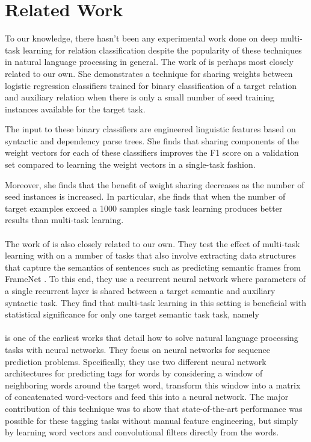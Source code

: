 \section{Related Work}
To our knowledge, there hasn't been any experimental work done on deep multi-task learning for relation classification despite the popularity of these techniques in natural language processing in general. The work of \citet{jiang2009} is perhaps most closely related to our own. She demonstrates a technique for sharing weights between logistic regression classifiers trained for binary classification of a target relation and auxiliary relation when there is only a small number of seed training instances available for the target task. 

The input to these binary classifiers are engineered linguistic features based on syntactic and dependency parse trees. She finds that sharing components of the weight vectors for each of these classifiers improves the F1 score on a validation set compared to learning the weight vectors in a single-task fashion.

Moreover, she finds that the benefit of weight sharing decreases as the number of seed instances is increased. In particular, she finds that when the number of target examples exceed a 1000 samples single task learning produces better results than multi-task learning.
\\\\
The work of \citet{alonso2016} is also closely related to our own. They test the effect of multi-task learning with on a number of tasks that also involve extracting data structures that capture the semantics of sentences such as predicting semantic frames from FrameNet \cite{baker1998}. To this end, they use a recurrent neural network where parameters of a single recurrent layer is shared between a target semantic and auxiliary syntactic task. They find that multi-task learning in this setting is beneficial with statistical significance for only one target semantic task task, namely 
\\\\
\citet{collobert2011} is one of the earliest works that detail how to solve natural language processing tasks with neural networks. They focus on neural networks for sequence prediction problems. Specifically, they use two different neural network architectures for predicting tags for words by considering a window of neighboring words around the target word, transform this window into a matrix of concatenated word-vectors and feed this into a neural network. The major contribution of this technique was to show that state-of-the-art performance was possible for these tagging tasks without manual feature engineering, but simply by learning word vectors and convolutional filters directly from the words.

